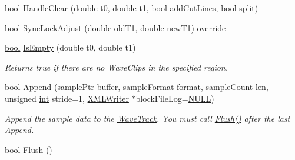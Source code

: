 \begin{DoxyCompactItemize}
\item 
\hyperlink{mac_2config_2i386_2lib-src_2libsoxr_2soxr-config_8h_abb452686968e48b67397da5f97445f5b}{bool} \hyperlink{class_wave_track_ab70b3459275bc45091a583cb5b849519}{Handle\+Clear} (double t0, double t1, \hyperlink{mac_2config_2i386_2lib-src_2libsoxr_2soxr-config_8h_abb452686968e48b67397da5f97445f5b}{bool} add\+Cut\+Lines, \hyperlink{mac_2config_2i386_2lib-src_2libsoxr_2soxr-config_8h_abb452686968e48b67397da5f97445f5b}{bool} split)
\item 
\hyperlink{mac_2config_2i386_2lib-src_2libsoxr_2soxr-config_8h_abb452686968e48b67397da5f97445f5b}{bool} \hyperlink{class_wave_track_a49cda2bf10befe089ebd666260e5c5f7}{Sync\+Lock\+Adjust} (double old\+T1, double new\+T1) override
\item 
\hyperlink{mac_2config_2i386_2lib-src_2libsoxr_2soxr-config_8h_abb452686968e48b67397da5f97445f5b}{bool} \hyperlink{class_wave_track_a5b87d35cb0fea96b149c43a997b20089}{Is\+Empty} (double t0, double t1)
\begin{DoxyCompactList}\small\item\em Returns true if there are no Wave\+Clips in the specified region. \end{DoxyCompactList}\item 
\hyperlink{mac_2config_2i386_2lib-src_2libsoxr_2soxr-config_8h_abb452686968e48b67397da5f97445f5b}{bool} \hyperlink{class_wave_track_adc09591a8d9b92cbbed08d8ccf28bac5}{Append} (\hyperlink{include_2audacity_2_types_8h_aaafb46d1caf7c79262fec96b577215fe}{sample\+Ptr} \hyperlink{structbuffer}{buffer}, \hyperlink{include_2audacity_2_types_8h_a9938d2e2f6adef23e745cd80ef379792}{sample\+Format} \hyperlink{_export_p_c_m_8cpp_a317afff57d87a89158c2b038d37b2b08}{format}, \hyperlink{include_2audacity_2_types_8h_afa427e1f521ea5ec12d054e8bd4d0f71}{sample\+Count} \hyperlink{lib_2expat_8h_af86d325fecfc8f47b61fbf5a5146f582}{len}, unsigned \hyperlink{xmltok_8h_a5a0d4a5641ce434f1d23533f2b2e6653}{int} stride=1, \hyperlink{class_x_m_l_writer}{X\+M\+L\+Writer} $\ast$block\+File\+Log=\hyperlink{px__mixer_8h_a070d2ce7b6bb7e5c05602aa8c308d0c4}{N\+U\+LL})
\begin{DoxyCompactList}\small\item\em Append the sample data to the \hyperlink{class_wave_track}{Wave\+Track}. You must call \hyperlink{class_wave_track_af2ca2143f5fec142410d26cf064ec37c}{Flush()} after the last Append. \end{DoxyCompactList}\item 
\hyperlink{mac_2config_2i386_2lib-src_2libsoxr_2soxr-config_8h_abb452686968e48b67397da5f97445f5b}{bool} \hyperlink{class_wave_track_af2ca2143f5fec142410d26cf064ec37c}{Flush} ()

\end{DoxyCompactItemize}
